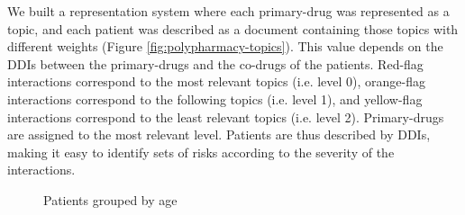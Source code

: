 We built a representation system where each primary-drug was represented as a topic, and each patient was described as a document containing those topics with different weights (Figure \ref{fig:polypharmacy-topics}). This value depends on the DDIs between the primary-drugs and the co-drugs of the patients. Red-flag interactions correspond to the most relevant topics (i.e. level 0), orange-flag interactions correspond to the following topics (i.e. level 1), and yellow-flag interactions correspond to the least relevant topics (i.e. level 2). Primary-drugs are assigned to the most relevant level. Patients are thus described by DDIs, making it easy to identify sets of risks according to the severity of the interactions.


\begin{figure}[ht]\centering
   \begin{minipage}{0.49\textwidth}
     \caption{Patients grouped by age}\label{subfig:poly-age}
   \end{minipage}
   \begin {minipage}[c]{0.49\textwidth}

\end{minipage}
\end{figure}
